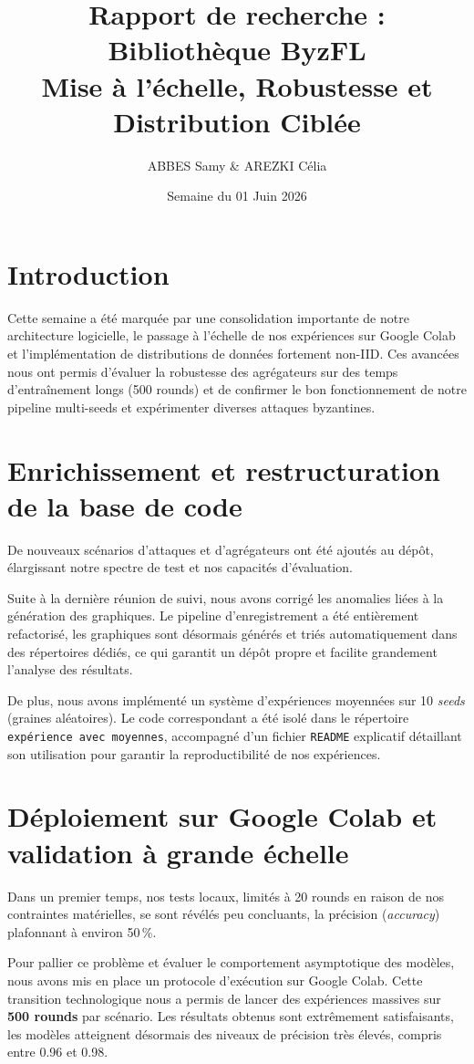 \documentclass[11pt, a4paper]{article}
\title{\textbf{Rapport de recherche : Bibliothèque ByzFL} \\ \large Mise à l'échelle, Robustesse et Distribution Ciblée}
\author{ABBES Samy \& AREZKI Célia}
\date{Semaine du 01 Juin 2026}
\begin{document}
\maketitle

\section{Introduction}
Cette semaine a été marquée par une consolidation importante de notre architecture logicielle, le passage à l'échelle de nos expériences sur Google Colab et l'implémentation de distributions de données fortement non-IID. Ces avancées nous ont permis d'évaluer la robustesse des agrégateurs sur des temps d'entraînement longs (500 rounds) et de confirmer le bon fonctionnement de notre pipeline multi-seeds et expérimenter diverses attaques byzantines.

\section{Enrichissement et restructuration de la base de code}
De nouveaux scénarios d'attaques et d'agrégateurs ont été ajoutés au dépôt, élargissant notre spectre de test et nos capacités d'évaluation. 

Suite à la dernière réunion de suivi, nous avons corrigé les anomalies liées à la génération des graphiques. Le pipeline d'enregistrement a été entièrement refactorisé, les graphiques sont désormais générés et triés automatiquement dans des répertoires dédiés, ce qui garantit un dépôt propre et facilite grandement l'analyse des résultats. 

De plus, nous avons implémenté un système d'expériences moyennées sur 10 \textit{seeds} (graines aléatoires). Le code correspondant a été isolé dans le répertoire \texttt{expérience avec moyennes}, accompagné d'un fichier \texttt{README} explicatif détaillant son utilisation pour garantir la reproductibilité de nos expériences.

\section{Déploiement sur Google Colab et validation à grande échelle}
Dans un premier temps, nos tests locaux, limités à 20 rounds en raison de nos contraintes matérielles, se sont révélés peu concluants, la précision (\textit{accuracy}) plafonnant à environ 50\,\%. 

Pour pallier ce problème et évaluer le comportement asymptotique des modèles, nous avons mis en place un protocole d'exécution sur Google Colab. Cette transition technologique nous a permis de lancer des expériences massives sur \textbf{500 rounds} par scénario. Les résultats obtenus sont extrêmement satisfaisants, les modèles atteignent désormais des niveaux de précision très élevés, compris entre 0.96 et 0.98.
\end{document}
